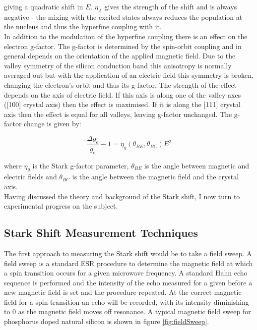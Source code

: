 giving a quadratic shift in $E$. $\eta_A$ gives the strength of the shift and is always negative - the mixing with the excited states always reduces the population at the nucleus and thus the hyperfine coupling with it.
\\
In addition to the modulation of the hyperfine coupling there is an effect on the electron g-factor.
The g-factor is determined by the spin-orbit coupling and in general depends on the orientation of the applied magnetic field.
Due to the valley symmetry of the silicon conduction band this anisotropy is normally averaged out but with the application of an electric field this symmetry is broken, changing the electron's orbit and thus its g-factor.
The strength of the effect depends on the axis of electric field.
If this axis is along one of the valley axes ([100] crystal axis) then the effect is maximised.
If it is along the [111] crystal axis then the effect is equal for all valleys, leaving g-factor unchanged.
The g-factor change is given by:

\begin{equation}
\frac{\Delta g_e}{g_e} - 1 = \eta_g(\theta_{BE}, \theta_{BC})E^2
\end{equation}

where $\eta_g$ is the Stark g-factor parameter, $\theta_{BE}$ is the angle between magnetic and electric fields and $\theta_{BC}$ is the angle between the magnetic field and the crystal axis.
\\
Having discussed the theory and background of the Stark shift, I now turn to experimental progress on the subject.

\subsection{Stark Shift Measurement Techniques}

The first approach to measuring the Stark shift would be to take a field sweep.
A field sweep is a standard ESR procedure to determine the magnetic field at which a spin transition occurs for a given microwave frequency.
A standard Hahn echo sequence is performed and the intensity of the echo measured for a given before a new magnetic field is set and the procedure repeated.
At the correct magnetic field for a spin transition an echo will be recorded, with its intensity diminishing to 0 as the magnetic field moves off resonance.
A typical magnetic field sweep for phosphorus doped natural silicon is shown in figure \ref{fig:fieldSweep}.

